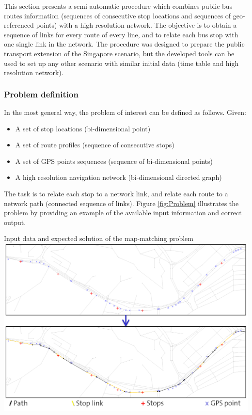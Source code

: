 This section presents a semi-automatic procedure which combines public bus routes information (sequences of consecutive stop locations and sequences of geo-referenced points) with a high resolution network. The objective is to obtain a sequence of links for every route of every line, and to relate each bus stop with one single link in the network. The procedure was designed to prepare the public transport extension of the Singapore scenario, but the developed tools can be used to set up any other scenario with similar initial data (time table and high resolution network).

\subsubsection{Problem definition}

In the most general way, the problem of interest can be defined as follows. Given:

\begin{itemize}
\item A set of stop locations (bi-dimensional point)
\item A set of route profiles (sequence of consecutive stops)
\item A set of GPS points sequences (sequence of bi-dimensional points)
\item A high resolution navigation network (bi-dimensional directed graph)
\end{itemize}

The task is to relate each stop to a network link, and relate each route to a network path (connected sequence of links). Figure \ref{fig:Problem} illustrates the problem by providing an example of the available input information and correct output.

\createfigure
{}
{Input data and expected solution of the map-matching problem}
{\label{fig:Problem}}
{\includegraphics[width=1.0\textwidth]{extending/figures/semiAuto/Problem.png}}
{}


